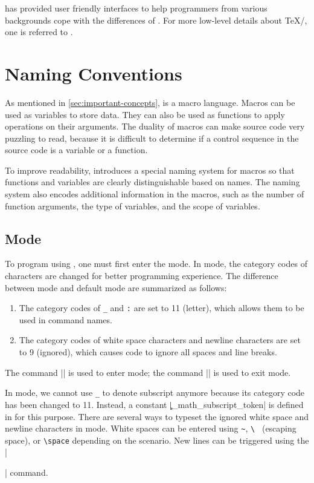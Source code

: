\documentclass{ltugboat}
\begin{document}
\LTT{} has provided user friendly interfaces to help \LT{} programmers from various backgrounds cope with the differences of \LT{}.
For more low-level details about \TeX{}/\LT{}, one is referred to \cite{knuth1984texbook,berry2017latex}.



\section{\LTT{} Naming Conventions}

As mentioned in \cref{sec:important-concepts}, \LT{} is a macro language.
Macros can be used as variables to store data.
They can also be used as functions to apply operations on their arguments.
The duality of macros can make \LT{} source code very puzzling to read, because it is difficult to determine if a control sequence in the source code is a variable or a function.

To improve readability, \LT{} introduces a special naming system for macros so that functions and variables are clearly distinguishable based on names. 
The naming system also encodes additional information in the macros, such as the number of function arguments, the type of variables, and the scope of variables. 


\subsection{\LTT{} Mode}


To program using \LTT{}, one must first enter the \LTT{} mode.
In \LTT{} mode, the category codes of characters are changed for better programming experience.
The difference between \LTT{} mode and default \LT{} mode are summarized as follows:
\begin{enumerate}
    \item The category codes of \verb|_| and \verb|:| are set to 11 (letter), which allows them to be used in command names.
    \item The category codes of white space characters and newline characters are set to 9 (ignored), which causes \LTT{} code to ignore all spaces and line breaks.
\end{enumerate}
The command \inltex|\ExplSyntaxOn| is used to enter \LTT{} mode; the command \inltex|\ExplSyntaxOff| is used to exit \LTT{} mode.

In \LTT{} mode, we cannot use \verb|_| to denote subscript anymore because its category code has been changed to 11. Instead, a constant \inltex|\c_math_subscript_token| is defined in \LTT{} for this purpose.
There are several ways to typeset the ignored white space and newline characters in \LTT{} mode.
White spaces can be entered using \verb|~|, \verb|\ | (escaping space), or \verb|\space| depending on the scenario.
New lines can be triggered using the \inltex|\par| command.
\end{document}
